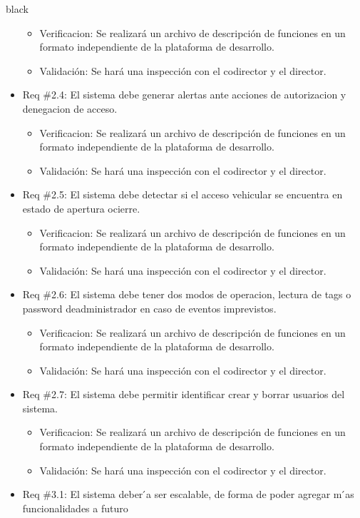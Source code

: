 \documentclass[
11pt, %
codirector, %
]{charter}
\begin{document}
\begin{consigna}{black}
\begin{itemize}
\begin{itemize}
	\item Verificacion: Se realizará un archivo de descripción de funciones en un formato independiente de la plataforma de desarrollo.
	\item Validación: Se hará una inspección con el codirector y el director.
\end{itemize}
\item Req \#2.4: El sistema debe generar alertas ante acciones de autorizacion y denegacion de acceso.
\begin{itemize}
	\item Verificacion: Se realizará un archivo de descripción de funciones en un formato independiente de la plataforma de desarrollo.
	\item Validación: Se hará una inspección con el codirector y el director.
\end{itemize}
\item Req \#2.5:  El sistema debe detectar si el acceso vehicular se encuentra en estado de apertura ocierre.
\begin{itemize}
	\item Verificacion: Se realizará un archivo de descripción de funciones en un formato independiente de la plataforma de desarrollo.
	\item Validación: Se hará una inspección con el codirector y el director.
\end{itemize}
\item Req \#2.6:  El  sistema  debe  tener  dos  modos  de  operacion,  lectura  de  tags  o  password  deadministrador en caso de eventos imprevistos.
\begin{itemize}
	\item Verificacion: Se realizará un archivo de descripción de funciones en un formato independiente de la plataforma de desarrollo.
	\item Validación: Se hará una inspección con el codirector y el director.
\end{itemize}
\item Req \#2.7: El sistema debe permitir identificar crear y borrar usuarios del sistema.
\begin{itemize}
	\item Verificacion: Se realizará un archivo de descripción de funciones en un formato independiente de la plataforma de desarrollo.
	\item Validación: Se hará una inspección con el codirector y el director.
\end{itemize}
\item Req \#3.1: El  sistema  deber ́a  ser  escalable,  de  forma  de  poder  agregar  m ́as  funcionalidades a futuro

\end{itemize}
\end{consigna}
\end{document}
